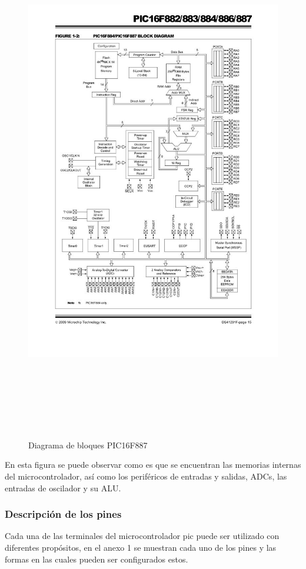 \documentclass[12pt,a4paper]{article}
\begin{document}
   \begin{figure}[htpb]
   \centering
   \includegraphics[height=23cm]{DIAGRAMA}
   \caption{Diagrama de bloques PIC16F887 \cite{PIC}}
   \label{fig:DI}
   \end{figure}
   
   En esta figura se puede observar como es que se encuentran las memorias internas del microcontrolador, así como los periféricos de entradas y salidas, ADCs, las entradas de oscilador y su ALU.
   
   \subsubsection{Descripción de los pines}
   Cada una de las terminales del microcontrolador pic puede ser utilizado con diferentes propósitos, en el anexo 1 se muestran cada uno de los pines y las formas en las cuales pueden ser configurados estos.
\end{document}
